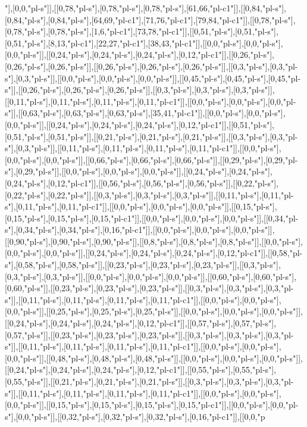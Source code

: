 "],[0,0,"pl-s"]],[[0,78,"pl-s"],[0,78,"pl-s"],[0,78,"pl-s"],[61,66,"pl-c1"]],[[0,84,"pl-s"],[0,84,"pl-s"],[0,84,"pl-s"],[64,69,"pl-c1"],[71,76,"pl-c1"],[79,84,"pl-c1"]],[[0,78,"pl-s"],[0,78,"pl-s"],[0,78,"pl-s"],[1,6,"pl-c1"],[73,78,"pl-c1"]],[[0,51,"pl-s"],[0,51,"pl-s"],[0,51,"pl-s"],[8,13,"pl-c1"],[22,27,"pl-c1"],[38,43,"pl-c1"]],[[0,0,"pl-s"],[0,0,"pl-s"],[0,0,"pl-s"]],[[0,24,"pl-s"],[0,24,"pl-s"],[0,24,"pl-s"],[0,12,"pl-c1"]],[[0,26,"pl-s"],[0,26,"pl-s"],[0,26,"pl-s"]],[[0,26,"pl-s"],[0,26,"pl-s"],[0,26,"pl-s"]],[[0,3,"pl-s"],[0,3,"pl-s"],[0,3,"pl-s"]],[[0,0,"pl-s"],[0,0,"pl-s"],[0,0,"pl-s"]],[[0,45,"pl-s"],[0,45,"pl-s"],[0,45,"pl-s"]],[[0,26,"pl-s"],[0,26,"pl-s"],[0,26,"pl-s"]],[[0,3,"pl-s"],[0,3,"pl-s"],[0,3,"pl-s"]],[[0,11,"pl-s"],[0,11,"pl-s"],[0,11,"pl-s"],[0,11,"pl-c1"]],[[0,0,"pl-s"],[0,0,"pl-s"],[0,0,"pl-s"]],[[0,63,"pl-s"],[0,63,"pl-s"],[0,63,"pl-s"],[35,41,"pl-c1"]],[[0,0,"pl-s"],[0,0,"pl-s"],[0,0,"pl-s"]],[[0,24,"pl-s"],[0,24,"pl-s"],[0,24,"pl-s"],[0,12,"pl-c1"]],[[0,51,"pl-s"],[0,51,"pl-s"],[0,51,"pl-s"]],[[0,21,"pl-s"],[0,21,"pl-s"],[0,21,"pl-s"]],[[0,3,"pl-s"],[0,3,"pl-s"],[0,3,"pl-s"]],[[0,11,"pl-s"],[0,11,"pl-s"],[0,11,"pl-s"],[0,11,"pl-c1"]],[[0,0,"pl-s"],[0,0,"pl-s"],[0,0,"pl-s"]],[[0,66,"pl-s"],[0,66,"pl-s"],[0,66,"pl-s"]],[[0,29,"pl-s"],[0,29,"pl-s"],[0,29,"pl-s"]],[[0,0,"pl-s"],[0,0,"pl-s"],[0,0,"pl-s"]],[[0,24,"pl-s"],[0,24,"pl-s"],[0,24,"pl-s"],[0,12,"pl-c1"]],[[0,56,"pl-s"],[0,56,"pl-s"],[0,56,"pl-s"]],[[0,22,"pl-s"],[0,22,"pl-s"],[0,22,"pl-s"]],[[0,3,"pl-s"],[0,3,"pl-s"],[0,3,"pl-s"]],[[0,11,"pl-s"],[0,11,"pl-s"],[0,11,"pl-s"],[0,11,"pl-c1"]],[[0,0,"pl-s"],[0,0,"pl-s"],[0,0,"pl-s"]],[[0,15,"pl-s"],[0,15,"pl-s"],[0,15,"pl-s"],[0,15,"pl-c1"]],[[0,0,"pl-s"],[0,0,"pl-s"],[0,0,"pl-s"]],[[0,34,"pl-s"],[0,34,"pl-s"],[0,34,"pl-s"],[0,16,"pl-c1"]],[[0,0,"pl-s"],[0,0,"pl-s"],[0,0,"pl-s"]],[[0,90,"pl-s"],[0,90,"pl-s"],[0,90,"pl-s"]],[[0,8,"pl-s"],[0,8,"pl-s"],[0,8,"pl-s"]],[[0,0,"pl-s"],[0,0,"pl-s"],[0,0,"pl-s"]],[[0,24,"pl-s"],[0,24,"pl-s"],[0,24,"pl-s"],[0,12,"pl-c1"]],[[0,58,"pl-s"],[0,58,"pl-s"],[0,58,"pl-s"]],[[0,23,"pl-s"],[0,23,"pl-s"],[0,23,"pl-s"]],[[0,3,"pl-s"],[0,3,"pl-s"],[0,3,"pl-s"]],[[0,0,"pl-s"],[0,0,"pl-s"],[0,0,"pl-s"]],[[0,60,"pl-s"],[0,60,"pl-s"],[0,60,"pl-s"]],[[0,23,"pl-s"],[0,23,"pl-s"],[0,23,"pl-s"]],[[0,3,"pl-s"],[0,3,"pl-s"],[0,3,"pl-s"]],[[0,11,"pl-s"],[0,11,"pl-s"],[0,11,"pl-s"],[0,11,"pl-c1"]],[[0,0,"pl-s"],[0,0,"pl-s"],[0,0,"pl-s"]],[[0,25,"pl-s"],[0,25,"pl-s"],[0,25,"pl-s"]],[[0,0,"pl-s"],[0,0,"pl-s"],[0,0,"pl-s"]],[[0,24,"pl-s"],[0,24,"pl-s"],[0,24,"pl-s"],[0,12,"pl-c1"]],[[0,57,"pl-s"],[0,57,"pl-s"],[0,57,"pl-s"]],[[0,23,"pl-s"],[0,23,"pl-s"],[0,23,"pl-s"]],[[0,3,"pl-s"],[0,3,"pl-s"],[0,3,"pl-s"]],[[0,11,"pl-s"],[0,11,"pl-s"],[0,11,"pl-s"],[0,11,"pl-c1"]],[[0,0,"pl-s"],[0,0,"pl-s"],[0,0,"pl-s"]],[[0,48,"pl-s"],[0,48,"pl-s"],[0,48,"pl-s"]],[[0,0,"pl-s"],[0,0,"pl-s"],[0,0,"pl-s"]],[[0,24,"pl-s"],[0,24,"pl-s"],[0,24,"pl-s"],[0,12,"pl-c1"]],[[0,55,"pl-s"],[0,55,"pl-s"],[0,55,"pl-s"]],[[0,21,"pl-s"],[0,21,"pl-s"],[0,21,"pl-s"]],[[0,3,"pl-s"],[0,3,"pl-s"],[0,3,"pl-s"]],[[0,11,"pl-s"],[0,11,"pl-s"],[0,11,"pl-s"],[0,11,"pl-c1"]],[[0,0,"pl-s"],[0,0,"pl-s"],[0,0,"pl-s"]],[[0,15,"pl-s"],[0,15,"pl-s"],[0,15,"pl-s"],[0,15,"pl-c1"]],[[0,0,"pl-s"],[0,0,"pl-s"],[0,0,"pl-s"]],[[0,32,"pl-s"],[0,32,"pl-s"],[0,32,"pl-s"],[0,16,"pl-c1"]],[[0,0,"p